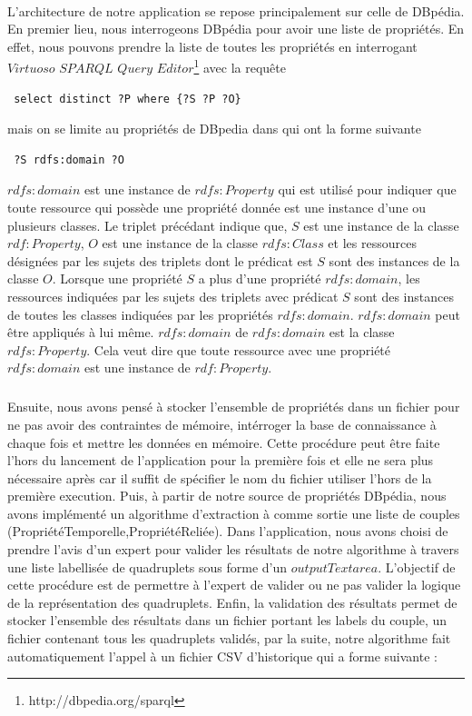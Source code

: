 \documentclass[12pt,a4	]{report}
\begin{document}
\paragraph{}
L'architecture de notre application se repose principalement sur celle de DBpédia. En premier lieu, nous interrogeons DBpédia pour avoir une liste de propriétés. En effet, nous pouvons prendre la liste de toutes les propriétés en interrogant $Virtuoso$ $SPARQL$ $Query$ $Editor$\footnote{http://dbpedia.org/sparql}  avec la requête \begin{verbatim} select distinct ?P where {?S ?P ?O}\end{verbatim}mais on se limite au propriétés de DBpedia dans qui ont la forme suivante \begin{verbatim} ?S rdfs:domain ?O \end{verbatim} $rdfs:domain$ est une instance de $rdfs:Property$ qui est utilisé pour indiquer que toute ressource qui possède une propriété donnée est une instance d'une ou plusieurs classes. Le triplet précédant indique que, $S$ est une instance de la classe $rdf:Property$, $O$ est une instance de la classe $rdfs:Class$ et les ressources désignées par les sujets des triplets dont le prédicat est $S$ sont des instances de la classe $O$. Lorsque une propriété $S$ a plus d'une propriété $rdfs:domain$, les ressources indiquées par les sujets des triplets avec prédicat $S$ sont des instances de toutes les classes indiquées par les propriétés $rdfs:domain$. $rdfs:domain$ peut être appliqués à lui même. $rdfs:domain$ de $rdfs:domain$ est la classe $rdfs:Property$. Cela veut dire que toute ressource avec une propriété $rdfs:domain$ est une instance de $rdf:Property$. 
\subparagraph{}
Ensuite, nous avons pensé à stocker l'ensemble de propriétés dans un fichier pour ne pas avoir des contraintes de mémoire, intérroger la base de connaissance à chaque fois et mettre les données en mémoire. Cette procédure peut être faite l'hors du lancement de l'application pour la première fois et elle ne sera plus nécessaire après car il suffit de spécifier le nom du fichier utiliser l'hors de la première execution. Puis, à partir de notre source de propriétés DBpédia, nous avons implémenté un algorithme d'extraction à comme sortie une liste de couples (PropriétéTemporelle,PropriétéReliée). Dans l'application, nous avons choisi de prendre l'avis d'un expert pour valider les résultats de notre algorithme à travers une liste labellisée de quadruplets sous forme d'un $output Textarea$. L'objectif de cette procédure est de permettre à l'expert de valider ou ne pas valider la logique de la représentation des quadruplets. Enfin, la validation des résultats permet de stocker l'ensemble des résultats dans un fichier portant les labels du couple, un fichier contenant tous les quadruplets validés, par la suite, notre algorithme fait automatiquement l'appel à un fichier CSV d'historique qui a forme suivante :
\end{document}
